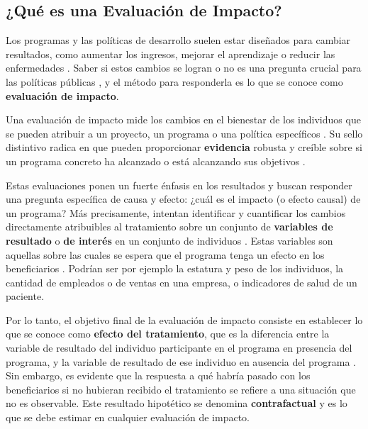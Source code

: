 \documentclass[../../main.tex]{subfiles}
\begin{document}
\subsection{¿Qué es una Evaluación de Impacto?}

Los programas y las políticas de desarrollo suelen estar diseñados para cambiar
resultados, como aumentar los ingresos, mejorar el aprendizaje o reducir las enfermedades
\cite{gertler-2016}. Saber si estos cambios se logran o no es una pregunta crucial para
las políticas públicas \cite{gertler-2016}, y el método para responderla es lo que se
conoce como \textbf{evaluación de impacto}.

Una evaluación de impacto mide los cambios en el bienestar de los individuos que se pueden
atribuir a un proyecto, un programa o una política específicos \cite{gertler-2016}. Su
sello distintivo radica en que pueden proporcionar \textbf{evidencia} robusta y creíble
sobre si un programa concreto ha alcanzado o está alcanzando sus objetivos
\cite{gertler-2016}.

Estas evaluaciones ponen un fuerte énfasis en los resultados y buscan responder una
pregunta específica de causa y efecto: ¿cuál es el impacto (o efecto causal) de un
programa? Más precisamente, intentan identificar y cuantificar los cambios directamente
atribuibles al tratamiento \cite{gertler-2016} sobre un conjunto de \textbf{variables de
resultado} o \textbf{de interés} en un conjunto de individuos \cite{bernal}. Estas
variables son aquellas sobre las cuales se espera que el programa tenga un efecto en los
beneficiarios \cite{bernal}. Podrían ser por ejemplo la estatura y peso de los individuos,
la cantidad de empleados o de ventas en una empresa, o indicadores de salud de un
paciente.

Por lo tanto, el objetivo final de la evaluación de impacto consiste en establecer lo que
se conoce como \textbf{efecto del tratamiento}, que es la diferencia entre la variable de
resultado del individuo participante en el programa en presencia del programa, y la
variable de resultado de ese individuo en ausencia del programa \cite{bernal}. Sin
embargo, es evidente que la respuesta a qué habría pasado con los beneficiarios si no
hubieran recibido el tratamiento se refiere a una situación que no es observable. Este
resultado hipotético se denomina \textbf{contrafactual} y es lo que se debe estimar en
cualquier evaluación de impacto.
\end{document}
